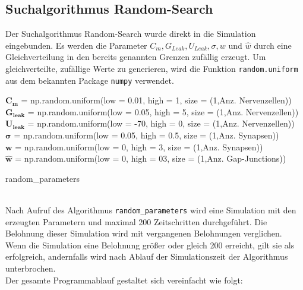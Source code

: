 	\subsection{Suchalgorithmus Random-Search}
		Der Suchalgorithmus Random-Search wurde direkt in die Simulation eingebunden. Es werden die Parameter $C_m, G_{Leak}, U_{Leak}, \sigma, w$ und $\hat{w}$ durch eine Gleichverteilung in den bereits genannten Grenzen zufällig erzeugt. Um gleichverteilte, zufällige Werte zu generieren, wird die Funktion \texttt{random.uniform} aus dem bekannten Package \texttt{numpy} \cite{NumPy} verwendet.\\
		\begin{algorithm}
			
				$\boldsymbol{C_m}$ = np.random.uniform(low = 0.01, high = 1, size = (1,Anz. Nervenzellen))\\
				$\boldsymbol{G_{leak}}$ = np.random.uniform(low = 0.05, high = 5, size = (1,Anz. Nervenzellen))\\
				$\boldsymbol{U_{leak}}$ = np.random.uniform(low = -70, high = 0, size = (1,Anz. Nervenzellen))\\
				$\boldsymbol{\sigma}$ = np.random.uniform(low = 0.05, high = 0.5, size = (1,Anz. Synapsen))\\
				$\boldsymbol{w}$ = np.random.uniform(low = 0, high = 3, size = (1,Anz. Synapsen))\\
				$\boldsymbol{\hat{w}}$ = np.random.uniform(low = 0, high = 03, size = (1,Anz. Gap-Junctions))
			\caption{random\_parameters}
		\end{algorithm}\\
		Nach Aufruf des Algorithmus \texttt{random\_parameters} wird eine Simulation mit den erzeugten Parametern und maximal 200 Zeitschritten durchgeführt. Die Belohnung dieser Simulation wird mit vergangenen Belohnungen verglichen. Wenn die Simulation eine Belohnung größer oder gleich 200 erreicht, gilt sie als erfolgreich, andernfalls wird nach Ablauf der Simulationszeit der Algorithmus unterbrochen.\\
		Der gesamte Programmablauf gestaltet sich vereinfacht wie folgt:
